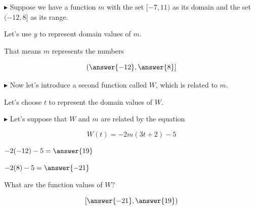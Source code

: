 \documentclass{ximera}
\begin{document}
\begin{example}




\textbf{\textcolor{blue!55!black}{$\blacktriangleright$}}  Suppose we have a function $m$ with the set $[-7, 11)$ as its domain and the set $(-12, 8]$ as its range. 

Let's use $y$ to represent domain values of $m$.  



\begin{question}

That means $m$ represents the numbers 

\[
\left( \answer{-12}, \answer{8} \right]
\]

\end{question}






\textbf{\textcolor{blue!55!black}{$\blacktriangleright$}} Now let's introduce a second function called $W$, which is related to $m$. 

Let's choose $t$ to represent the domain values of $W$. 


\textbf{\textcolor{blue!55!black}{$\blacktriangleright$}} Let's suppose that $W$ and $m$ are related by the equation 

\[ 
W(t) = -2 m(3t + 2) - 5
\]





\begin{question}

$-2 (-12) - 5 = \answer{19}$ 

$-2 (8) - 5 = \answer{-21}$ 

\end{question}






\begin{question}

What are the function values of $W$?


\[
\left[ \answer{-21}, \answer{19} \right)
\]


\end{question}


\end{example}
\end{document}
